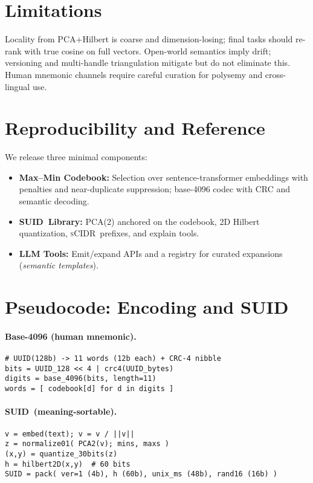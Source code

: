 \documentclass[11pt]{article}
\newcommand{\suid}{\textsc{SUID}}
\newcommand{\scidr}{\textsc{sCIDR}}
\begin{document}
\section{Limitations}
Locality from PCA$+$Hilbert is coarse and dimension-losing; final tasks should re-rank with true cosine on full vectors. Open-world semantics imply drift; versioning and multi-handle triangulation mitigate but do not eliminate this. Human mnemonic channels require careful curation for polysemy and cross-lingual use.

\section{Reproducibility and Reference}
We release three minimal components:
\begin{itemize}[leftmargin=2em]
  \item \textbf{Max--Min Codebook:} Selection over sentence-transformer embeddings with penalties and near-duplicate suppression; base-4096 codec with CRC and semantic decoding.
  \item \textbf{\suid\ Library:} PCA(2) anchored on the codebook, 2D Hilbert quantization, \scidr\ prefixes, and explain tools.
  \item \textbf{LLM Tools:} Emit/expand APIs and a registry for curated expansions (\emph{semantic templates}).
\end{itemize}

\section*{Pseudocode: Encoding and \suid}
\paragraph{Base-4096 (human mnemonic).}
\begin{lstlisting}[basicstyle=\ttfamily\small, frame=single]
# UUID(128b) -> 11 words (12b each) + CRC-4 nibble
bits = UUID_128 << 4 | crc4(UUID_bytes)
digits = base_4096(bits, length=11)
words = [ codebook[d] for d in digits ]
\end{lstlisting}

\paragraph{\suid\ (meaning-sortable).}
\begin{lstlisting}[basicstyle=\ttfamily\small, frame=single]
v = embed(text); v = v / ||v||
z = normalize01( PCA2(v); mins, maxs )
(x,y) = quantize_30bits(z)
h = hilbert2D(x,y)  # 60 bits
SUID = pack( ver=1 (4b), h (60b), unix_ms (48b), rand16 (16b) )
\end{lstlisting}
\end{document}
